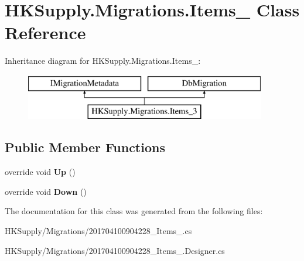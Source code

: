 \hypertarget{class_h_k_supply_1_1_migrations_1_1_items__3}{}\section{H\+K\+Supply.\+Migrations.\+Items\+\_ Class Reference}
\label{class_h_k_supply_1_1_migrations_1_1_items__3}
Inheritance diagram for H\+K\+Supply.\+Migrations.\+Items\+\_\+:\begin{figure}[H]
\begin{center}
\leavevmode
\includegraphics[height=2.000000cm]{class_h_k_supply_1_1_migrations_1_1_items__3}
\end{center}
\end{figure}
\subsection*{Public Member Functions}
\begin{DoxyCompactItemize}
\item 
\mbox{\label{class_h_k_supply_1_1_migrations_1_1_items__3_a4d2af3f86d16c1fc3f3e4bf8e77f297a}} 
override void {\bfseries Up} ()
\item 
\mbox{\label{class_h_k_supply_1_1_migrations_1_1_items__3_a09260e40596eaa35ba68a7241249de5a}} 
override void {\bfseries Down} ()
\end{DoxyCompactItemize}


The documentation for this class was generated from the following files\+:\begin{DoxyCompactItemize}
\item 
H\+K\+Supply/\+Migrations/201704100904228\+\_\+\+Items\+\_.\+cs\item 
H\+K\+Supply/\+Migrations/201704100904228\+\_\+\+Items\+\_.\+Designer.\+cs\end{DoxyCompactItemize}
